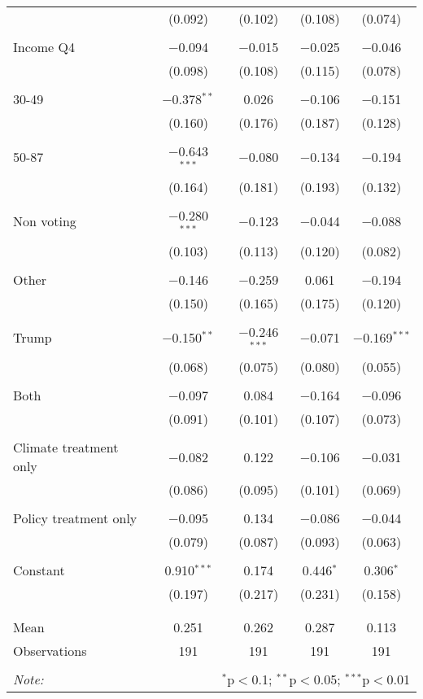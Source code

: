\begin{tabular}{@{\extracolsep{5pt}}lcccc}
  & (0.092) & (0.102) & (0.108) & (0.074) \\ 
  & & & & \\ 
 Income Q4 & $-$0.094 & $-$0.015 & $-$0.025 & $-$0.046 \\ 
  & (0.098) & (0.108) & (0.115) & (0.078) \\ 
  & & & & \\ 
 30-49 & $-$0.378$^{**}$ & 0.026 & $-$0.106 & $-$0.151 \\ 
  & (0.160) & (0.176) & (0.187) & (0.128) \\ 
  & & & & \\ 
 50-87 & $-$0.643$^{***}$ & $-$0.080 & $-$0.134 & $-$0.194 \\ 
  & (0.164) & (0.181) & (0.193) & (0.132) \\ 
  & & & & \\ 
 Non voting & $-$0.280$^{***}$ & $-$0.123 & $-$0.044 & $-$0.088 \\ 
  & (0.103) & (0.113) & (0.120) & (0.082) \\ 
  & & & & \\ 
 Other & $-$0.146 & $-$0.259 & 0.061 & $-$0.194 \\ 
  & (0.150) & (0.165) & (0.175) & (0.120) \\ 
  & & & & \\ 
 Trump & $-$0.150$^{**}$ & $-$0.246$^{***}$ & $-$0.071 & $-$0.169$^{***}$ \\ 
  & (0.068) & (0.075) & (0.080) & (0.055) \\ 
  & & & & \\ 
 Both & $-$0.097 & 0.084 & $-$0.164 & $-$0.096 \\ 
  & (0.091) & (0.101) & (0.107) & (0.073) \\ 
  & & & & \\ 
 Climate treatment only & $-$0.082 & 0.122 & $-$0.106 & $-$0.031 \\ 
  & (0.086) & (0.095) & (0.101) & (0.069) \\ 
  & & & & \\ 
 Policy treatment only & $-$0.095 & 0.134 & $-$0.086 & $-$0.044 \\ 
  & (0.079) & (0.087) & (0.093) & (0.063) \\ 
  & & & & \\ 
 Constant & 0.910$^{***}$ & 0.174 & 0.446$^{*}$ & 0.306$^{*}$ \\ 
  & (0.197) & (0.217) & (0.231) & (0.158) \\ 
  & & & & \\ 
\hline \\[-1.8ex] 
Mean & 0.251 & 0.262 & 0.287 & 0.113 \\ 
Observations & 191 & 191 & 191 & 191 \\ 
\hline 
\hline \\[-1.8ex] 
\textit{Note:}  & \multicolumn{4}{r}{$^{*}$p$<$0.1; $^{**}$p$<$0.05; $^{***}$p$<$0.01} \\ 
\end{tabular} 
